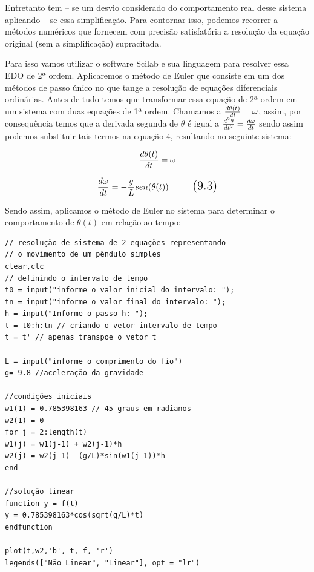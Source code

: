 Entretanto tem – se um desvio considerado do comportamento real desse sistema aplicando – se essa simplificação. Para contornar isso, podemos recorrer a métodos numéricos que fornecem com precisão satisfatória a resolução da equação original (sem a simplificação) supracitada.

Para isso vamos utilizar o software Scilab e sua linguagem para resolver essa EDO de 2ª ordem. Aplicaremos o método de Euler que consiste em um dos métodos de passo único no que tange a resolução de equações diferenciais ordinárias. Antes de tudo temos que transformar essa equação de 2ª ordem em um sistema com duas equações de 1ª ordem. Chamamos a $\large \frac{d\theta(t)}{dt} = \omega$, assim, por consequência temos que a derivada segunda de $\theta$ é igual a $\large \frac{d^2\theta}{dt^2} = \frac{d\omega}{dt}$ sendo assim podemos substituir tais termos na equação 4, resultando no seguinte sistema:

$$\Large \frac{d\theta(t)}{dt} = \omega$$

\begin{equation}
\Large \frac{d\omega}{dt} = -\frac{g}{L} sen(\theta(t))
\tag{9.3}
\end{equation}

Sendo assim, aplicamos o método de Euler no sistema para determinar o comportamento de $\theta(t)$ em relação ao tempo:

\begin{verbatim}
// resolução de sistema de 2 equações representando 
// o movimento de um pêndulo simples
clear,clc
// definindo o intervalo de tempo
t0 = input("informe o valor inicial do intervalo: ");
tn = input("informe o valor final do intervalo: ");
h = input("Informe o passo h: ");
t = t0:h:tn // criando o vetor intervalo de tempo
t = t' // apenas transpoe o vetor t

L = input("informe o comprimento do fio")
g= 9.8 //aceleração da gravidade

//condições iniciais
w1(1) = 0.785398163 // 45 graus em radianos
w2(1) = 0
for j = 2:length(t)
w1(j) = w1(j-1) + w2(j-1)*h
w2(j) = w2(j-1) -(g/L)*sin(w1(j-1))*h
end

//solução linear 
function y = f(t)
y = 0.785398163*cos(sqrt(g/L)*t)
endfunction

plot(t,w2,'b', t, f, 'r')
legends(["Não Linear", "Linear"], opt = "lr")
\end{verbatim}